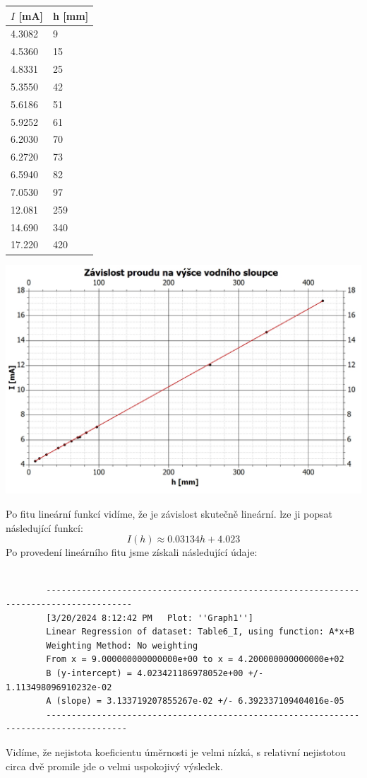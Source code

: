 \documentclass[czech,11pt,a4paper]{article}
\begin{document}
	\begin{center}
		\begin{tabular}{|l|l|}
		\hline
		$I$ [mA]      & h [mm]   \\ \hline
		4.3082 & 9   \\ \hline
		4.5360  & 15  \\ \hline
		4.8331 & 25  \\ \hline
		5.3550  & 42  \\ \hline
		5.6186 & 51  \\ \hline
		5.9252 & 61  \\ \hline
		6.2030  & 70  \\ \hline
		6.2720  & 73  \\ \hline
		6.5940  & 82  \\ \hline
		7.0530  & 97  \\ \hline
		12.081 & 259 \\ \hline
		14.690  & 340 \\ \hline
		17.220  & 420 \\ \hline
	\end{tabular}
	\begin{center}
		
		\includegraphics[width=0.6\linewidth, ]{ih} 
	\end{center}
	\end{center}
	Po fitu lineární funkcí vidíme, že je závislost skutečně lineární. lze ji popsat následující funkcí:	
	\begin{equation}
		I (h) \approx 0.03134h + 4.023
	\end{equation}
	Po provedení lineárního fitu jsme získali následující údaje:
	\begin{verbatim}
		
		---------------------------------------------------------------------------------------
		[3/20/2024 8:12:42 PM	Plot: ''Graph1'']
		Linear Regression of dataset: Table6_I, using function: A*x+B
		Weighting Method: No weighting
		From x = 9.000000000000000e+00 to x = 4.200000000000000e+02
		B (y-intercept) = 4.023421186978052e+00 +/- 1.113498096910232e-02
		A (slope) = 3.133719207855267e-02 +/- 6.392337109404016e-05
		--------------------------------------------------------------------------------------
	\end{verbatim}
	Vidíme, že nejistota koeficientu úměrnosti je velmi nízká, s relativní nejistotou circa dvě promile jde o velmi uspokojivý výsledek.
\end{document}
